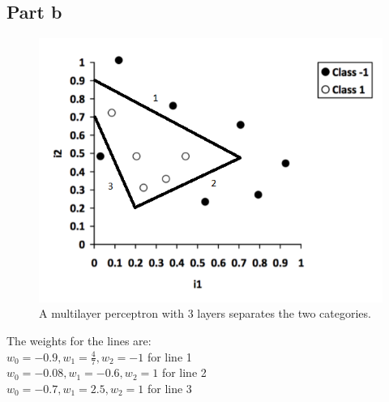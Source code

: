 \documentclass[12pt]{article}
\begin{document}
\subsection*{Part b}

\begin{figure}[H]
    \centering
    \includegraphics[width=1\textwidth]{question_5_plot_b}
    \caption{A multilayer perceptron with 3 layers separates the two categories.}
    \label{fig:question_5_plot_b}
\end{figure}

The weights for the lines are:
\\
$w_0 = -0.9, w_1 = \frac{4}{7}, w_2 = -1$ for line 1 
\\
$w_0 = -0.08, w_1 = -0.6, w_2 = 1$ for line 2
\\
$w_0 = -0.7, w_1 = 2.5, w_2 = 1$ for line 3
\end{document}
